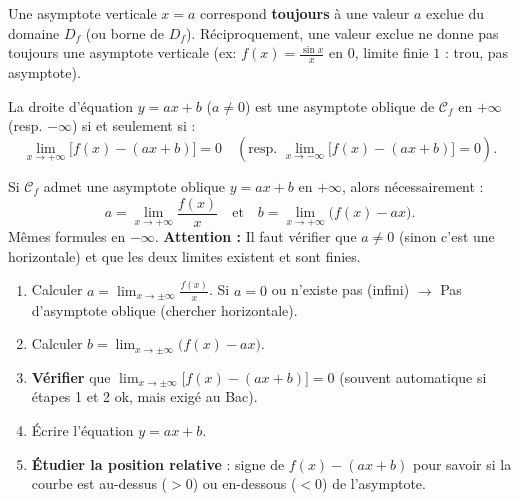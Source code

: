 \documentclass[11pt]{article}
\newcommand{\cle}[1]{{\popxbold\color{popdark}#1}}
\newcounter{popsec}
\newcounter{popsub}
\newcommand{\courssub}[1]{%
  \stepcounter{popsub}%
  \par\vspace{9pt}\noindent{\popxbold\fontsize{11.5}{13}\selectfont\color{popink}{\color{poporange}\thepopsec.\thepopsub}\hspace{6pt}#1}\par\nopagebreak\vspace{4pt}
}
\begin{document}
\begin{savaistu}
Une asymptote verticale $x=a$ correspond \textbf{toujours} à une valeur $a$ exclue du domaine $D_f$ (ou borne de $D_f$). Réciproquement, une valeur exclue ne donne pas toujours une asymptote verticale (ex: $f(x)=\frac{\sin x}{x}$ en $0$, limite finie $1$ : trou, pas asymptote).
\end{savaistu}

\courssub{Asymptotes obliques}

\begin{definition}
La droite d'équation $y=ax+b$ ($a \neq 0$) est une \cle{asymptote oblique} de $\mathcal{C}_f$ en $+\infty$ (resp. $-\infty$) si et seulement si :
\[
\lim_{x\to +\infty}\big[f(x)-(ax+b)\big]=0 \quad\left(\text{resp. } \lim_{x\to -\infty}\big[f(x)-(ax+b)\big]=0\right).
\]
\end{definition}

\begin{propriete}
Si $\mathcal{C}_f$ admet une asymptote oblique $y=ax+b$ en $+\infty$, alors nécessairement :
\[
a = \lim_{x\to +\infty}\frac{f(x)}{x} \quad\text{et}\quad b = \lim_{x\to +\infty}\big(f(x)-ax\big).
\]
Mêmes formules en $-\infty$. \textbf{Attention :} Il faut vérifier que $a \neq 0$ (sinon c'est une horizontale) et que les deux limites existent et sont finies.
\end{propriete}

\begin{methode}
\begin{enumerate}
\item Calculer $a = \lim_{x\to \pm\infty}\frac{f(x)}{x}$. Si $a=0$ ou n'existe pas (infini) $\rightarrow$ Pas d'asymptote oblique (chercher horizontale).
\item Calculer $b = \lim_{x\to \pm\infty}\big(f(x)-ax\big)$.
\item \textbf{Vérifier} que $\lim_{x\to \pm\infty}\big[f(x)-(ax+b)\big]=0$ (souvent automatique si étapes 1 et 2 ok, mais exigé au Bac).
\item Écrire l'équation $y=ax+b$.
\item \textbf{Étudier la position relative} : signe de $f(x)-(ax+b)$ pour savoir si la courbe est au-dessus ($>0$) ou en-dessous ($<0$) de l'asymptote.
\end{enumerate}
\end{methode}
\end{document}
